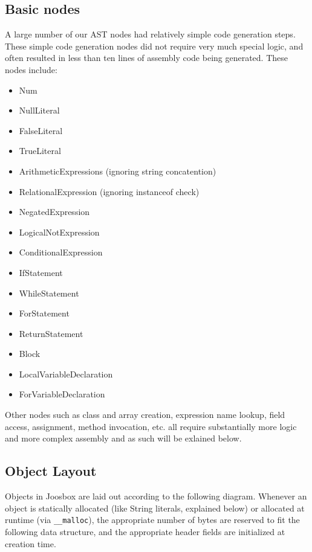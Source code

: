 \documentclass[letterpaper]{article}
\begin{document}
  \subsection{Basic nodes}

  A large number of our AST nodes had relatively simple code generation steps.
  These simple code generation nodes did not require very much special logic,
  and often resulted in less than ten lines of assembly code being generated.
  These nodes include:

  \begin{itemize}
    \item Num
    \item NullLiteral
    \item FalseLiteral
    \item TrueLiteral
    \item ArithmeticExpressions (ignoring string concatention)
    \item RelationalExpression (ignoring instanceof check)
    \item NegatedExpression
    \item LogicalNotExpression
    \item ConditionalExpression
    \item IfStatement
    \item WhileStatement
    \item ForStatement
    \item ReturnStatement
    \item Block
    \item LocalVariableDeclaration
    \item ForVariableDeclaration
  \end{itemize}

  Other nodes such as class and array creation, expression name lookup,
  field access, assignment, method invocation, etc. all require substantially
  more logic and more complex assembly and as such will be exlained below.

  \subsection{Object Layout}

  Objects in Joosbox are laid out according to the following diagram. Whenever
  an object is statically allocated (like String literals, explained below) or
  allocated at runtime (via {\tt \_\_malloc}), the appropriate number of bytes
  are reserved to fit the following data structure, and the appropriate header
  fields are initialized at creation time.
\end{document}

